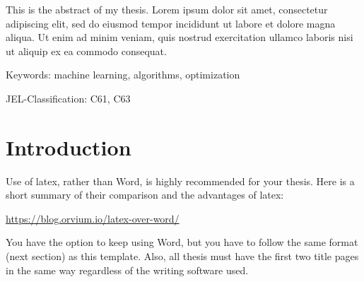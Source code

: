 \documentclass[12pt]{article}
\begin{document}

\makethesistitle

\makeacademicpage
\noindent This is the abstract of my thesis. Lorem ipsum dolor sit amet, consectetur adipiscing elit, sed do eiusmod tempor incididunt ut labore et dolore magna aliqua. Ut enim ad minim veniam, quis nostrud exercitation ullamco laboris nisi ut aliquip ex ea commodo consequat.

\par\vspace{4em}\noindent
{\color{zinc700}Keywords:} machine learning, algorithms, optimization
\par\noindent
{\color{zinc700}JEL-Classification:} C61, C63

\newpage

\section{Introduction}

Use of latex, rather than Word, is highly recommended for your thesis. Here is a short summary of their comparison and the advantages of latex: 

\href{https://blog.orvium.io/latex-over-word/}{https://blog.orvium.io/latex-over-word/}

You have the option to keep using Word, but you have to follow the same format (next section) as this template. Also, all thesis must have the first two title pages in the same way regardless of the writing software used.
\end{document}
